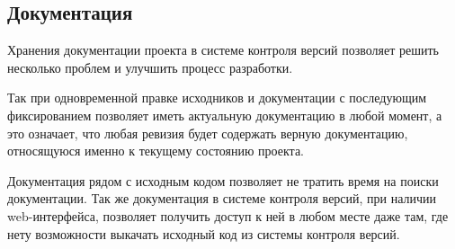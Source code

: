 \subsection{ Документация } \label{sect3_5_1}

Хранения документации проекта в системе контроля версий позволяет решить несколько проблем и улучшить процесс разработки.

Так при одновременной правке исходников и документации с последующим фиксированием позволяет иметь актуальную документацию в любой момент, а это означает, что любая ревизия будет содержать верную документацию, относящуюся именно к текущему состоянию проекта.

Документация рядом с исходным кодом позволяет не тратить время на поиски документации. Так же документация в системе контроля версий, при наличии web-интерфейса, позволяет получить доступ к ней в любом месте даже там, где нету возможности выкачать исходный код из системы контроля версий.





 
 
 

 



































\clearpage



